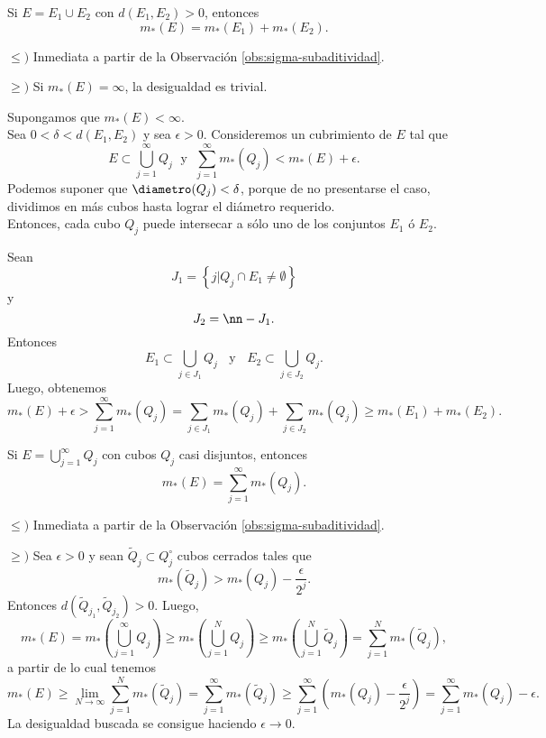     \begin{observacion}{}
       Si $E=E_1\cup E_2$ con $d(E_1,E_2)>0$, entonces
    \[
    m_{*}(E)=m_{*}(E_1)+m_{*}(E_2).
    \]
    \begin{demo}
    $\leq)$ Inmediata a partir de la Observaci\'on \ref{obs:sigma-subaditividad}.
    
    $\geq)$
          Si $m_{*}(E)=\infty$,  la desigualdad es trivial. 
          
          Supongamos que $m_{*}(E)<\infty$. \\
    Sea $0<\delta <d(E_1, E_2)$ y sea $\epsilon>0$.
    Consideremos un cubrimiento de $E$ tal que 
    \[E\subset \bigcup\limits_{j=1}^{\infty} Q_j\;\mbox{  y }\;
    \sum\limits_{j=1}^{\infty} m_{*}(Q_j)<m_{*}(E)+\epsilon.\]
    Podemos suponer que $\diametro(Q_j)<\delta$, porque de no presentarse el caso, dividimos en m\'as cubos hasta lograr el di\'ametro requerido.
    \\
    Entonces, cada cubo $Q_j$ puede intersecar a s\'olo uno de los conjuntos $E_1$ \'o $E_2$.

    Sean \[
    J_1=\left\{j|Q_j \cap E_1\neq \emptyset\right\}
        \]
        y 
    \[
    J_2=\nn-J_1.
    \]
Entonces
    \[
E_1\subset \bigcup\limits_{j\in J_1} Q_j \;\;\mbox { y }\;\;
E_2\subset \bigcup\limits_{j \in J_2} Q_j.
    \]
    Luego, obtenemos
    \[
    m_{*}(E)+\epsilon>\sum\limits_{j=1}^{\infty} m_{*}(Q_j)
    =\sum\limits_{j \in J_1} m_{*}(Q_j)+\sum\limits_{j\in J_2} m_{*}(Q_j)
    \geq 
    m_{*}(E_1)+m_{*}(E_2).
    \]
    \end{demo}
    \end{observacion}
    
\begin{observacion}\label{obs:sigma-aditividad-medida-ext}
Si $E=\bigcup\limits_{j=1}^{\infty} Q_j$ con cubos $Q_j$ casi disjuntos, entonces
\[
m_{*}(E)=\sum\limits_{j=1}^{\infty} m_{*}(Q_j).\]
\begin{demo}
$\leq)$ Inmediata a partir de la Observaci\'on \ref{obs:sigma-subaditividad}.

$\geq)$
Sea $\epsilon>0$ y sean $\widetilde{Q}_j\subset Q_j^{\circ}$ cubos cerrados tales que 
\[
m_{*}(\widetilde{Q}_j)>m_{*}(Q_j )-\frac{\epsilon}{2^j}.
\]
Entonces $d(\widetilde{Q}_{j_1},\widetilde{Q}_{j_2})>0$.
Luego, 
\[
m_{*}(E) =m_{*}\left(\bigcup\limits_{j=1}^{\infty} Q_j\right)
\geq m_{*}\left(\bigcup\limits_{j=1}^{N} Q_j\right)
\geq m_{*}\left(\bigcup\limits_{j=1}^{N} \widetilde{Q}_j\right)
=\sum\limits_{j=1}^N m_{*}(\widetilde{Q}_j),
\]
a partir de lo cual tenemos
\[
m_{*}(E)\geq \lim\limits_{N\to \infty}\sum\limits_{j=1}^N  m_{*}(\widetilde{Q}_j)
=\sum\limits_{j=1}^{\infty} m_{*}(\widetilde{Q}_j)
\geq 
\sum\limits_{j=1}^{\infty} \left( m_{*}({Q}_j )-\frac{\epsilon}{2^j}\right)
=
\sum\limits_{j=1}^{\infty} m_{*}({Q}_j)-\epsilon.
\]
La desigualdad buscada se consigue haciendo $\epsilon \to 0$.
\end{demo}

\end{observacion}

